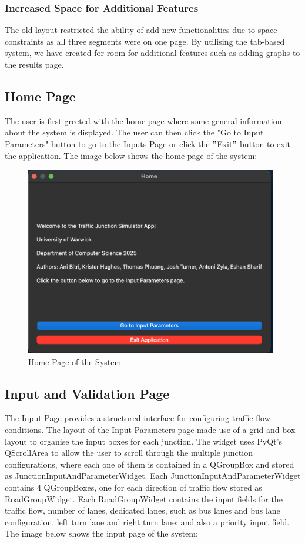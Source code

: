 \documentclass{article}
\begin{document}
    \subsubsection{Increased Space for Additional Features}
    The old layout restricted the ability of add new functionalities due to space constraints as all three segments were on one page. By utilising the tab-based system,
    we have created for room for additional features such as adding graphs to the results page.

    \subsection{Home Page}

    The user is first greeted with the home page where some general information about the system is displayed. The user can then click the "Go to Input Parameters" button to go to the Inputs Page
    or click the \("\)Exit\("\) button to exit the application.
    The image below shows the home page of the system:

    \begin{figure}[H]
        \centering
        \includegraphics[width=11cm]{homepage}
        \caption{Home Page of the System}
        \label{fig:homepage}
    \end{figure}

    \subsection{Input and Validation Page}

    The Input Page provides a structured interface for configuring traffic flow conditions. The layout of the Input Parameters page made use of a grid and box layout to organise the input boxes for each junction. The widget uses PyQt's QScrollArea to allow the user to scroll through the multiple junction configurations, where each one of them
    is contained in a QGroupBox and stored as JunctionInputAndParameterWidget. Each JunctionInputAndParameterWidget contains 4 QGroupBoxes, one for each direction of traffic flow stored as RoadGroupWidget. Each RoadGroupWidget contains the input fields for the
    traffic flow, number of lanes, dedicated lanes, such as bus lanes and bus lane configuration, left turn lane and right turn lane; and also a priority input field. The image below shows the input page of the system:
\end{document}
